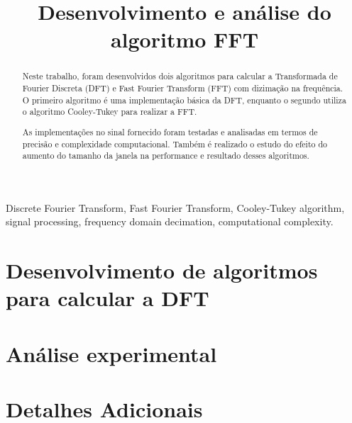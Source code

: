 \documentclass[conference]{IEEEtran}
\begin{document}
   \makeatletter
    \newcommand{\linebreakand}{%
      \end{@IEEEauthorhalign}
      \hfill\mbox{}\par
      \mbox{}\hfill\begin{@IEEEauthorhalign}
    }
    \makeatother

\title{Desenvolvimento e análise do algoritmo FFT\\
}

\author{
\IEEEauthorblockN{}
\IEEEauthorblockA{}
}

\maketitle

\begin{abstract}
    Neste trabalho, foram desenvolvidos dois algoritmos para calcular a Transformada de Fourier Discreta (DFT) e Fast Fourier Transform (FFT) com dizimação na frequência. O primeiro algoritmo é uma implementação básica da DFT, enquanto o segundo utiliza o algoritmo Cooley-Tukey para realizar a FFT. 

    As implementações no sinal fornecido foram testadas e analisadas em termos de precisão e complexidade computacional. Também é realizado o estudo do efeito do aumento do tamanho da janela na performance e resultado desses algoritmos.
\end{abstract}

\begin{IEEEkeywords}
    Discrete Fourier Transform, Fast Fourier Transform, Cooley-Tukey algorithm, signal processing, frequency domain decimation, computational complexity.
\end{IEEEkeywords}

\section{Desenvolvimento de algoritmos para calcular a DFT}


\section{Análise experimental}



\appendix
\section{Detalhes Adicionais}
\end{document}
